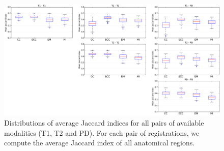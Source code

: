 \begin{figure}[t!]
\centering
    \includegraphics[width=\linewidth]{./images/all_modality_pairs_boxplots.png}
    \caption{{\small Distributions of average Jaccard indices for all pairs of available modalities (T1, T2 and PD). For each pair of registrations, we compute the average Jaccard index of all anatomical regions.}}
\label{fig:all_pairs_boxplots}\figcloser
\end{figure}

